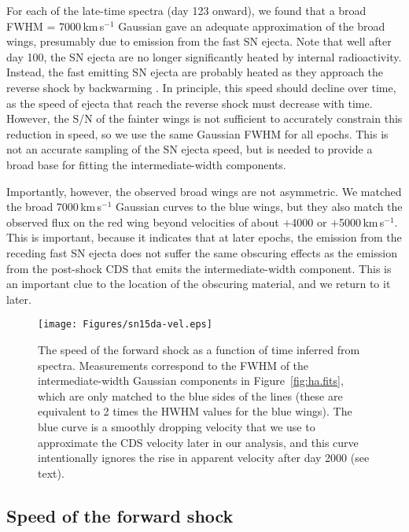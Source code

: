 \documentclass[fleqn,usenatbib,useAMS]{mnras}
\begin{document}
For each of the late-time spectra (day 123 onward), we found that a
broad FWHM = 7000\,km\,s$^{-1}$ Gaussian gave an adequate approximation
of the broad wings, presumably due to emission from the fast SN
ejecta.  Note that well after day 100, the SN ejecta are no longer
significantly heated by internal radioactivity.  Instead, the fast
emitting SN ejecta are probably heated as they approach the reverse
shock by backwarming \citep[see][]{smith08tf}.  In principle, this speed should decline over
time, as the speed of ejecta that reach the reverse shock must
decrease with time.  However, the S/N of the fainter wings
is not sufficient to accurately constrain this reduction in speed, so
we use the same Gaussian FWHM for all epochs.  This is not an accurate
sampling of the SN ejecta speed, but is needed to provide a broad
base for fitting the intermediate-width components.

Importantly, however, the observed broad wings are not asymmetric.  We
matched the broad 7000\,km\,s$^{-1}$ Gaussian curves to the blue wings,
but they also match the observed flux on the red wing beyond
velocities of about $+$4000 or $+$5000\,km\,s$^{-1}$.  This is
important, because it indicates that at later epochs, the emission
from the receding fast SN ejecta does not suffer the same obscuring effects as
the emission from the post-shock CDS that emits the intermediate-width
component.  This is an important clue to the location of the obscuring
material, and we return to it later.


\begin{figure}\begin{center}
\texttt{[image: Figures/sn15da-vel.eps]}
\end{center}
\caption{The speed of the forward shock as a function of time inferred
  from spectra.  Measurements correspond to the FWHM of the
  intermediate-width Gaussian components in Figure~\ref{fig:ha.fits},
  which are only matched to the blue sides of the lines (these are
  equivalent to 2 times the HWHM values for the blue wings).  The blue curve
  is a smoothly dropping velocity that we use to approximate the CDS
  velocity later in our analysis, and this curve intentionally ignores the rise 
  in apparent velocity after day 2000 (see text).}
\label{fig:vel}
\end{figure}



\subsection{Speed of the forward shock}
\end{document}

